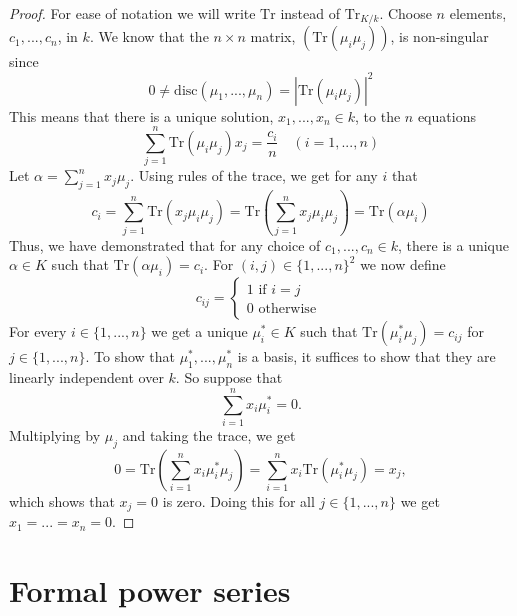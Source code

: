 \documentclass{article}
\newcommand{\tr}{\text{Tr}}
\begin{document}
\begin{proof}
For ease of notation we will write $\tr$ instead of $\tr_{K/k}$. Choose $n$ elements, $c_1, ..., c_n$, in $k$. We know that the $n \times n$ matrix, $(\tr (\mu_i \mu_j))$, is non-singular since $$0 \neq \text{disc}(\mu_1, ..., \mu_n) = |\tr(\mu_i \mu_j)|^2$$
This means that there is a unique solution, $x_1, ..., x_n \in k$, to the $n$ equations
$$\sum_{j=1}^n \tr(\mu_i \mu_j) x_j = \frac{c_i}{n} \quad (i = 1, ..., n)$$
Let $\alpha = \sum_{j=1}^n x_j \mu_j$. Using rules of the trace, we get for any $i$ that
$$c_i = \sum_{j=1}^n \tr(x_j \mu_i \mu_j) = \tr(\sum_{j=1}^n x_j \mu_i \mu_j) = \tr(\alpha \mu_i)$$
Thus, we have demonstrated that for any choice of $c_1, ..., c_n \in k$, there is a unique $\alpha \in K$ such that $\tr(\alpha \mu_i)= c_i$. For $(i,j) \in \{1, ..., n\}^2$ we now define 
$$c_{ij} = \begin{cases*}
    1 \text{ if } i = j \\
    0 \text{ otherwise }
\end{cases*}$$
For every $i \in \{1, ..., n \}$ we get a unique $\mu_i^* \in K$ such that $\tr(\mu_i^* \mu_j) = c_{ij}$ for $j \in \{ 1, ..., n \}$. To show that $\mu_1^*, ..., \mu_n^*$ is a basis, it suffices to show that they are linearly independent over $k$. So suppose that
$$\sum_{i=1}^n x_i \mu_i^* = 0.$$
Multiplying by $\mu_j$ and taking the trace, we get
$$0 = \tr(\sum_{i=1}^n x_i \mu_i^* \mu_j) = \sum_{i=1}^n x_i \tr(\mu_i^* \mu_j) = x_j,$$
which shows that $x_j = 0$ is zero. Doing this for all $j \in \{1, ..., n \}$ we get $x_1 = ... = x_n = 0$.
\end{proof}



\section{Formal power series}
\end{document}
